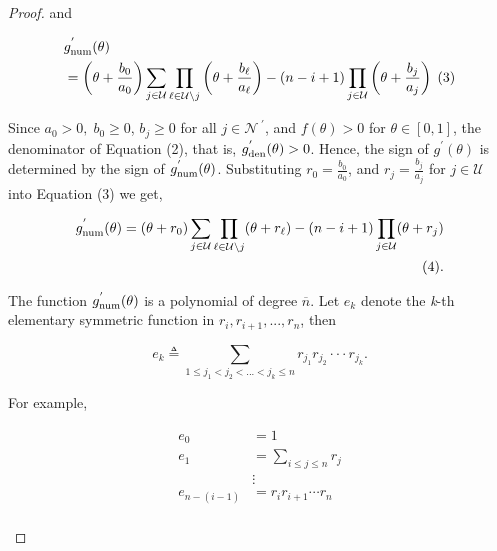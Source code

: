 \documentclass[letterpaper]{article} %
\theoremstyle{definition}
\begin{document}
\begin{proof}
\noindent and
\begin{linenomath}
\begin{equation*}
\begin{split}
& g^{'}_{\textnormal{num}}(\theta) \\ &= \left( \theta + \displaystyle \frac{b_{0}}{a_{0}} \right) \displaystyle \sum_{j \in \mathcal{U}} \displaystyle \prod_{\ell \in \mathcal{U} \backslash j} \left( \theta + \frac{b_{\ell}}{a_{\ell}}\right)  - (n - i + 1) \prod_{j \in \mathcal{U}} \left(\theta  + \displaystyle \frac{b_{j}}{a_{j}} \right) \;\textnormal{(3)}
\end{split}
\end{equation*}
\end{linenomath}
\noindent Since $a_{0} > 0, \;b_{0} \geq 0$, \; $b_{j} \geq 0$ for all $j \in \mathcal{N}^{\;'}$, and $f(\theta) > 0$ for $\theta \in [0,1]$, the denominator of Equation (2), that is,  $g^{'}_{\textnormal{den}}(\theta) > 0$. Hence, the sign of $g^{'}(\theta)$ is determined by the sign of $g^{'}_{\textnormal{num}}(\theta)$. Substituting $r_{0} = \displaystyle \frac{b_{0}}{a_{0}}$, and $r_{j} = \displaystyle \frac{b_{j}}{a_{j}}$ for $j \in \mathcal{U}$ into Equation (3) we get,
\begin{linenomath}
\begin{equation*}
\begin{split}
g^{'}_{\textnormal{num}}(\theta) = (\theta + r_{0}) \displaystyle \sum_{j \in \mathcal{U}} \displaystyle \prod_{\ell \in \mathcal{U} \backslash j} (\theta + r_{\ell}) - (n - i + 1)  \displaystyle \prod_{j \in \mathcal{U}} (\theta + r_{j}) \\\textnormal{(4)}.
\end{split}
\end{equation*}
\end{linenomath}

\noindent The function $g^{'}_{\textnormal{num}}(\theta)$ is a polynomial of degree $\overline{n}$. Let $e_{k}$ denote the \textit{k}-th elementary symmetric function in $r_{i}, r_{i+1}, ..., r_{n}$, then
\begin{linenomath}
\begin{equation*}
e_{k} \triangleq \displaystyle \sum_{1 \leq j_{1} < j_{2} < ...< j_{k} \leq n} r_{j_{1}} r_{j_{2}} \cdot \cdot \cdot r_{j_{k}}.    
\end{equation*}
\end{linenomath}

\noindent For example,
\begin{linenomath}
\begin{equation*}
\begin{split}
e_{0} & = 1 \\
e_{1} & = \displaystyle \sum_{i \leq j \leq n} r_{j} \\
& \vdots\\
e_{n-(i-1)} & = r_{i}r_{i+1} \cdots r_{n}\\
\end{split}    
\end{equation*}
\end{linenomath}


\end{proof}
\end{document}
